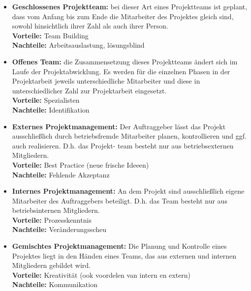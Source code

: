 \documentclass[11pt,a4paper]{article}
\begin{document}
\begin{itemize}
\item \textbf{Geschlossenes Projektteam:} bei dieser Art eines Projektteams ist geplant, dass vom Anfang bis zum
Ende die Mitarbeiter des Projektes gleich sind, sowohl hinsichtlich ihrer
Zahl als auch ihrer Person.\\
\textbf{Vorteile:} Team Building\\
\textbf{Nachteile:} Arbeitsauslastung, lösungsblind

\item \textbf{Offenes Team:} die Zusammensetzung dieses Projektteams ändert sich im Laufe der
Projektabwicklung. Es werden für die einzelnen Phasen in der Projektarbeit
jeweils unterschiedliche Mitarbeiter und diese in unterschiedlicher Zahl
zur Projektarbeit eingesetzt.\\
\textbf{Vorteile:} Spezialisten\\
\textbf{Nachteile:} Identifikation

\item \textbf{Externes Projektmanagement:} Der Auftraggeber lässt das Projekt ausschließlich durch betriebsfremde
Mitarbeiter planen, kontrollieren und ggf. auch realisieren. D.h. das Projekt-
team besteht nur aus betriebsexternen Mitgliedern.\\
\textbf{Vorteile:} Best Practice (neue frische Ideeen)\\
\textbf{Nachteile:} Fehlende Akzeptanz

\item \textbf{Internes Projektmanagement:} An dem Projekt sind ausschließlich eigene Mitarbeiter des Auftraggebers
beteiligt. D.h. das Team besteht nur aus betriebsinternen Mitgliedern.\\
\textbf{Vorteile:} Prozesskenntnis\\
\textbf{Nachteile:} Veränderungsscheu

\item \textbf{Gemischtes Projektmanagement:} Die Planung und Kontrolle eines Projektes liegt in den Händen eines Teams,
das aus externen und internen Mitgliedern gebildet wird.\\
\textbf{Vorteile:} Kreativität (ook voordelen van intern en extern)\\
\textbf{Nachteile:} Kommunikation
\end{itemize}
\end{document}
